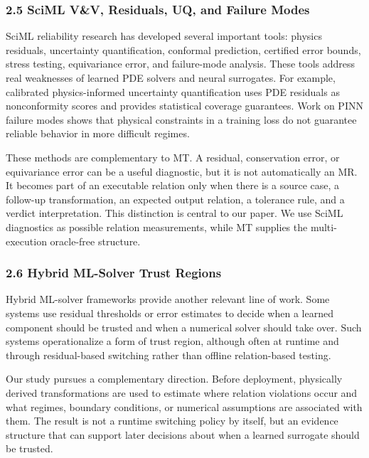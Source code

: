 \subsubsection{2.5 SciML V\&V, Residuals, UQ, and Failure
Modes}\label{sciml-vv-residuals-uq-and-failure-modes}

SciML reliability research has developed several important tools:
physics residuals, uncertainty quantification, conformal prediction,
certified error bounds, stress testing, equivariance error, and
failure-mode analysis. These tools address real weaknesses of learned
PDE solvers and neural surrogates. For example, calibrated
physics-informed uncertainty quantification uses PDE residuals as
nonconformity scores and provides statistical coverage guarantees. Work
on PINN failure modes shows that physical constraints in a training loss
do not guarantee reliable behavior in more difficult regimes.

These methods are complementary to MT. A residual, conservation error,
or equivariance error can be a useful diagnostic, but it is not
automatically an MR. It becomes part of an executable relation only when
there is a source case, a follow-up transformation, an expected output
relation, a tolerance rule, and a verdict interpretation. This
distinction is central to our paper. We use SciML diagnostics as
possible relation measurements, while MT supplies the multi-execution
oracle-free structure.

\subsubsection{2.6 Hybrid ML-Solver Trust
Regions}\label{hybrid-ml-solver-trust-regions}

Hybrid ML-solver frameworks provide another relevant line of work. Some
systems use residual thresholds or error estimates to decide when a
learned component should be trusted and when a numerical solver should
take over. Such systems operationalize a form of trust region, although
often at runtime and through residual-based switching rather than
offline relation-based testing.

Our study pursues a complementary direction. Before deployment,
physically derived transformations are used to estimate where relation
violations occur and what regimes, boundary conditions, or numerical
assumptions are associated with them. The result is not a runtime
switching policy by itself, but an evidence structure that can support
later decisions about when a learned surrogate should be trusted.

